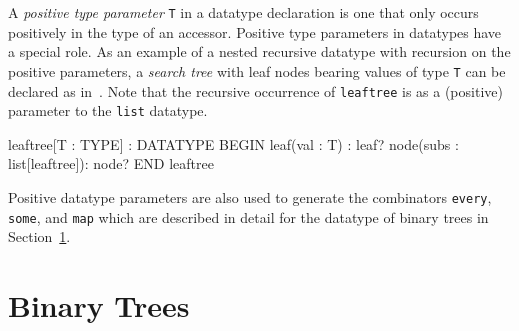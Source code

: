 \documentclass[11pt,twoside]{book}
\newcommand{\pvsref}[1]{\fbox{\footnotesize\ref{#1}}} \def\id#1{\hbox{\textt{#1}}} %
\begin{document}
A \emph{positive type parameter} \texttt{T} in a datatype declaration 
is one that only occurs positively in the type of an accessor.
Positive type parameters in datatypes have a special role.
As an example of a nested recursive datatype with recursion on the positive
parameters,  a \emph{search tree} with leaf nodes bearing 
values of type \texttt{T} can be declared as in~\pvsref{leaftree}\@.
Note that the recursive occurrence of \texttt{leaftree} is as a (positive)
parameter to the \texttt{list} datatype.  
\begin{session*}\label{leaftree}
leaftree[T : TYPE] : DATATYPE
 BEGIN
  leaf(val : T) : leaf?
  node(subs : list[leaftree]): node?
 END leaftree
\end{session*}

 Positive datatype parameters are also used to generate the
combinators \texttt{every}, \texttt{some}, and \texttt{map} which
are described in detail for the datatype of binary trees in
Section~\ref{binary-trees}.  

\chapter{Binary Trees}\label{binary-trees}
\end{document}
